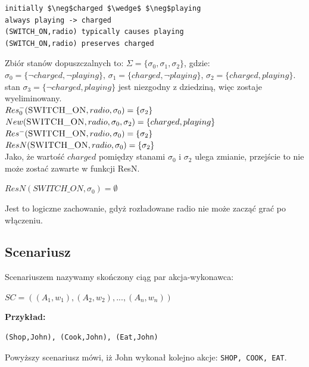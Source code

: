 \documentclass{article}
\begin{document}
\bigskip
{}
\begin{lstlisting}[mathescape=true]
initially $\neg$charged $\wedge$ $\neg$playing 
always playing -> charged
(SWITCH_ON,radio) typically causes playing
(SWITCH_ON,radio) preserves charged 
\end{lstlisting}

Zbiór stanów dopuszczalnych to: 
$\Sigma=\{\sigma_{0},\sigma_{1},\sigma_{2}\}$, gdzie:\\
$\sigma_{0}=\{\neg charged,\neg playing\}$, $\sigma_{1}=\{charged, \neg playing\}$, $\sigma_{2}=\{charged, playing\}$.\\

stan $\sigma_{3}=\{\neg charged, playing\}$ jest niezgodny z dziedziną, więc zostaje wyeliminowany.\\

$Res_{0}^{-}(\textsc{SWITCH\_ON},radio,\sigma_{0})=\{\sigma_{2}\}$\\
$New(\textsc{SWITCH\_ON},radio,\sigma_{0},\sigma_{2})=\{charged, playing\}$\\
$Res^{-}(\textsc{SWITCH\_ON},radio,\sigma_{0})=\{\sigma_{2}\}$\\
$ResN(\textsc{SWITCH\_ON},radio,\sigma_{0})=\{\sigma_{2}\}$\\ 



Jako, że wartość $charged$ pomiędzy stanami $\sigma_{0}$ i $\sigma_{2}$ ulega zmianie, przejście to nie może zostać zawarte w funkcji ResN.
\begin{center}
$ResN(SWITCH\_ON, \sigma_{0}) = \emptyset$
\end{center}
Jest to logiczne zachowanie, gdyż rozładowane radio nie może zacząć grać po włączeniu.




\subsection{Scenariusz}
Scenariuszem nazywamy skończony ciąg par akcja-wykonawca:
\begin{center}
$SC=((A_1,w_1),(A_2,w_2),...,(A_n,w_n))$
\end{center}
\textbf{Przykład:}
\begin{lstlisting}[mathescape=true]
(Shop,John), (Cook,John), (Eat,John)
\end{lstlisting}
Powyższy scenariusz mówi, iż John wykonał kolejno akcje: \texttt{SHOP, COOK, EAT}.
\end{document}
